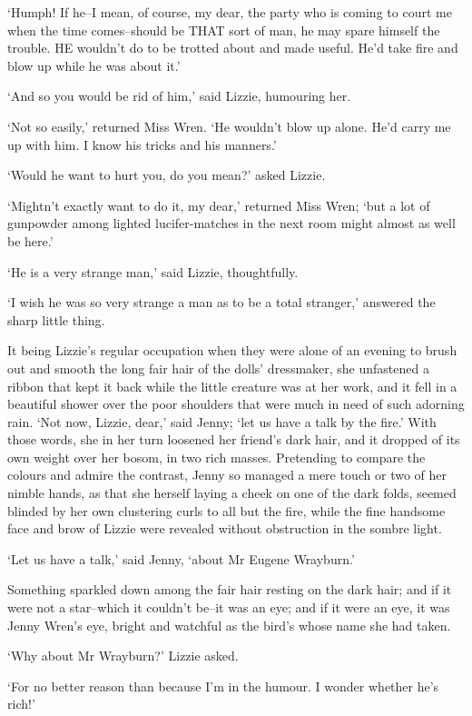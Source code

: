 ‘Humph! If he--I mean, of course, my dear, the party who is coming to
court me when the time comes--should be THAT sort of man, he may spare
himself the trouble. HE wouldn’t do to be trotted about and made useful.
He’d take fire and blow up while he was about it.’

‘And so you would be rid of him,’ said Lizzie, humouring her.

‘Not so easily,’ returned Miss Wren. ‘He wouldn’t blow up alone. He’d
carry me up with him. I know his tricks and his manners.’

‘Would he want to hurt you, do you mean?’ asked Lizzie.

‘Mightn’t exactly want to do it, my dear,’ returned Miss Wren; ‘but a
lot of gunpowder among lighted lucifer-matches in the next room might
almost as well be here.’

‘He is a very strange man,’ said Lizzie, thoughtfully.

‘I wish he was so very strange a man as to be a total stranger,’
answered the sharp little thing.

It being Lizzie’s regular occupation when they were alone of an evening
to brush out and smooth the long fair hair of the dolls’ dressmaker, she
unfastened a ribbon that kept it back while the little creature was at
her work, and it fell in a beautiful shower over the poor shoulders that
were much in need of such adorning rain. ‘Not now, Lizzie, dear,’ said
Jenny; ‘let us have a talk by the fire.’ With those words, she in her
turn loosened her friend’s dark hair, and it dropped of its own weight
over her bosom, in two rich masses. Pretending to compare the colours
and admire the contrast, Jenny so managed a mere touch or two of her
nimble hands, as that she herself laying a cheek on one of the dark
folds, seemed blinded by her own clustering curls to all but the fire,
while the fine handsome face and brow of Lizzie were revealed without
obstruction in the sombre light.

‘Let us have a talk,’ said Jenny, ‘about Mr Eugene Wrayburn.’

Something sparkled down among the fair hair resting on the dark hair;
and if it were not a star--which it couldn’t be--it was an eye; and
if it were an eye, it was Jenny Wren’s eye, bright and watchful as the
bird’s whose name she had taken.

‘Why about Mr Wrayburn?’ Lizzie asked.

‘For no better reason than because I’m in the humour. I wonder whether
he’s rich!’

